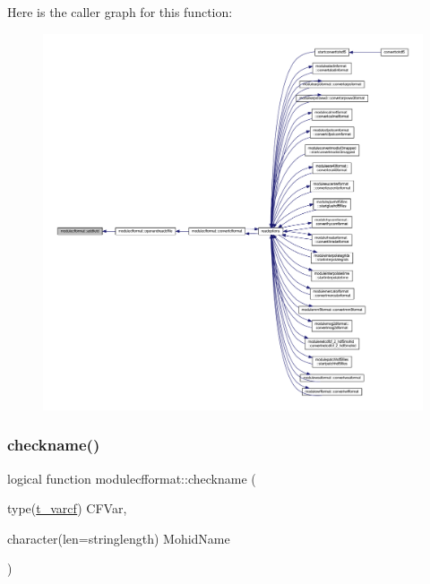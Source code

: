 Here is the caller graph for this function\+:\nopagebreak
\begin{figure}[H]
\begin{center}
\leavevmode
\includegraphics[width=350pt]{namespacemodulecfformat_a86156fe637bfdd6ff49e6bce5f187595_icgraph}
\end{center}
\end{figure}
\mbox{\label{namespacemodulecfformat_a63d0a39020a58e43589f5140948d8d58}} 
\subsubsection{\texorpdfstring{checkname()}{checkname()}}
{\footnotesize\ttfamily logical function modulecfformat\+::checkname (\begin{DoxyParamCaption}\item[{type(\mbox{\hyperlink{structncdflib_1_1t__varcf}{t\+\_\+varcf}})}]{C\+F\+Var,  }\item[{character(len=stringlength)}]{Mohid\+Name }\end{DoxyParamCaption})\hspace{0.3cm}{\ttfamily [private]}}

